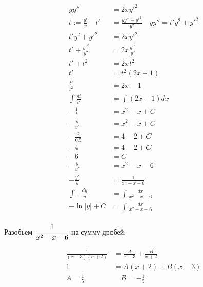 \begin{align*}
    yy''                       & = 2xy'^2                                            \\
    t := \frac{y'}{y} \quad t' & = \frac{yy'' - y'^2}{y^2} \quad yy'' = t'y^2 + y'^2 \\
    t'y^2 + y'^2               & = 2xy'^2                                   \tag{1}  \\
    t' + \frac{y'^2}{y^2}      & = 2x\frac{y'^2}{y^2}                       \tag{2}  \\
    t' + t^2                   & = 2xt^2                                             \\
    t'                         & = t^2(2x - 1)                                       \\
    \frac{t'}{t^2}             & = 2x - 1                                            \\
    \int \frac{dt}{t^2}        & = \int (2x - 1)dx                                   \\
    -\frac{1}{t}               & = x^2 - x + C                                       \\
    -\frac{y}{y'}              & = x^2 - x + C                                       \\
    -\frac{2}{0.5}             & = 4 - 2 + C                                \tag{3}  \\
    -4                         & = 4 - 2 + C                                         \\
    -6                         & = C                                                 \\
    -\frac{y}{y'}              & = x^2 - x - 6                                       \\
    -\frac{y'}{y}              & = \frac{1}{x^2 - x - 6}                             \\
    \int-\frac{dy}{y}          & = \int\frac{dx}{x^2 - x - 6}                        \\
    -\ln|y| + C                & = \int\frac{dx}{x^2 - x - 6}                        \\
\end{align*}

Разобьем $\cfrac{1}{x^2 - x - 6}$ на сумму дробей:

\begin{align*}
    \frac{1}{(x-3)(x+2)} & = \frac{A}{x-3} + \frac{B}{x+2} \\
    1                    & = A(x+2) + B(x-3)               \\
    A = \frac{1}{5}      & \quad B = -\frac{1}{5}
\end{align*}


